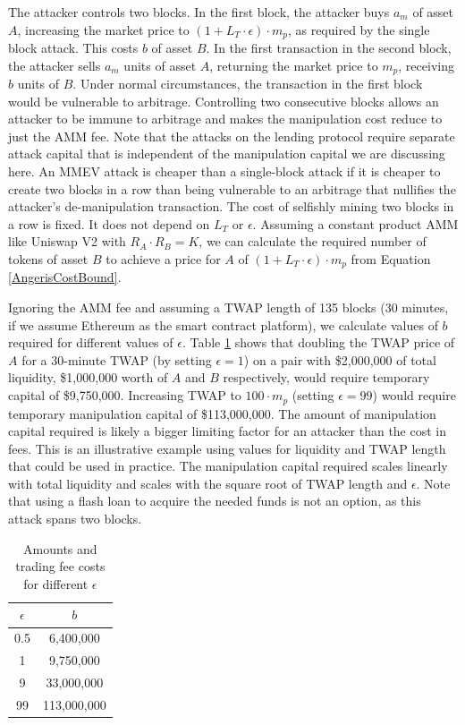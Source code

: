 The attacker controls two blocks. In the first block, the attacker buys $a_m$ of asset $A$, increasing the market price to $(1 + L_T \cdot \epsilon) \cdot m_p$, as required by the single block attack. This costs $b$ of asset $B$. In the first transaction in the second block, the attacker sells $a_m$ units of asset $A$, returning the market price to $m_p$, receiving $b$ units of $B$. Under normal circumstances, the transaction in the first block would be vulnerable to arbitrage. Controlling two consecutive blocks allows an attacker to be immune to arbitrage and makes the manipulation cost reduce to just the AMM fee. Note that the attacks on the lending protocol require separate attack capital that is independent of the manipulation capital we are discussing here. An MMEV attack is cheaper than a single-block attack if it is cheaper to create two blocks in a row than being vulnerable to an arbitrage that nullifies the attacker's de-manipulation transaction. The cost of selfishly mining two blocks in a row is fixed. It does not depend on $L_T$ or $\epsilon$. Assuming a constant product AMM like Uniswap V2 with $R_A \cdot R_B = K$, we can calculate the required number of tokens of asset $B$ to achieve a price for $A$ of $(1 + L_T \cdot \epsilon)\cdot m_p$ from Equation \ref{AngerisCostBound}.

Ignoring the AMM fee and assuming a TWAP length of 135 blocks (30 minutes, if we assume Ethereum as the smart contract platform), we calculate values of $b$ required for different values of $\epsilon$. Table \ref{TableCosts} shows that doubling the TWAP price of $A$ for a 30-minute TWAP (by setting $\epsilon = 1$) on a pair with \$2,000,000 of total liquidity, \$1,000,000 worth of $A$ and $B$ respectively, would require temporary capital of \$9,750,000. Increasing TWAP to $100 \cdot m_p$ (setting $\epsilon = 99$) would require temporary manipulation capital of \$113,000,000. The amount of manipulation capital required is likely a bigger limiting factor for an attacker than the cost in fees. This is an illustrative example using values for liquidity and TWAP length that could be used in practice. The manipulation capital required scales linearly with total liquidity and scales with the square root of TWAP length and $\epsilon$. Note that using a flash loan to acquire the needed funds is not an option, as this attack spans two blocks.

\begin{table}[ht]

\begin{center}
 \begin{tabular}{|c |c|} 
 \hline
 $\epsilon$ & $b$ \\ [0.5ex] 
 \hline\hline
 0.5 & 6,400,000\\ 
 \hline
 1 & 9,750,000\\ 
 \hline
 9 & 33,000,000\\ 
 \hline
 99 & 113,000,000\\  
 \hline
\end{tabular}
\end{center}
\caption{Amounts and trading fee costs for different $\epsilon$}
\label{TableCosts}
\end{table}



